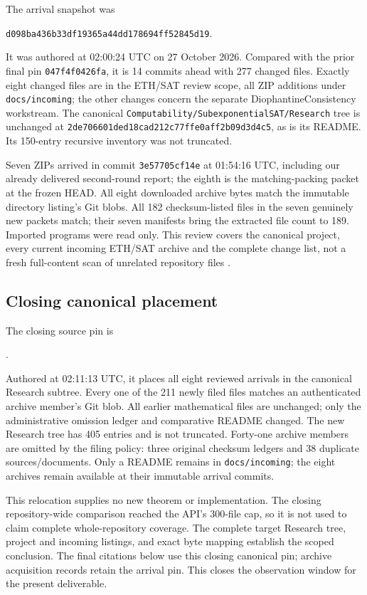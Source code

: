 The arrival snapshot was
\begin{center}\small\texttt{d098ba436b33df19365a44dd178694ff52845d19}.\end{center}
It was authored at 02:00:24 UTC on 27 October 2026. Compared with the prior final pin \texttt{047f4f0426fa}, it is 14 commits ahead with 277 changed files. Exactly eight changed files are in the ETH/SAT review scope, all ZIP additions under \texttt{docs/incoming}; the other changes concern the separate DiophantineConsistency workstream. The canonical \texttt{Computability/SubexponentialSAT/Research} tree is unchanged at \texttt{2de706601ded18cad212c77ffe0aff2b09d3d4c5}, as is its README. Its 150-entry recursive inventory was not truncated.

Seven ZIPs arrived in commit \texttt{3e57705cf14e} at 01:54:16 UTC, including our already delivered second-round report; the eighth is the matching-packing packet at the frozen HEAD. All eight downloaded archive bytes match the immutable directory listing's Git blobs. All 182 checksum-listed files in the seven genuinely new packets match; their seven manifests bring the extracted file count to 189. Imported programs were read only. This review covers the canonical project, every current incoming ETH/SAT archive and the complete change list, not a fresh full-content scan of unrelated repository files \cite{canonical,incoming}.

\subsection{Closing canonical placement}
The closing source pin is
\begin{center}\small\pin.\end{center}
Authored at 02:11:13 UTC, it places all eight reviewed arrivals in the canonical Research subtree. Every one of the 211 newly filed files matches an authenticated archive member's Git blob. All earlier mathematical files are unchanged; only the administrative omission ledger and comparative README changed. The new Research tree has 405 entries and is not truncated. Forty-one archive members are omitted by the filing policy: three original checksum ledgers and 38 duplicate sources/documents. Only a README remains in \texttt{docs/incoming}; the eight archives remain available at their immutable arrival commits.

This relocation supplies no new theorem or implementation. The closing repository-wide comparison reached the API's 300-file cap, so it is not used to claim complete whole-repository coverage. The complete target Research tree, project and incoming listings, and exact byte mapping establish the scoped conclusion. The final citations below use this closing canonical pin; archive acquisition records retain the arrival pin. This closes the observation window for the present deliverable.

